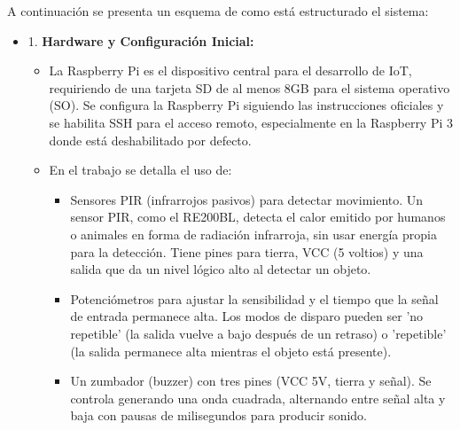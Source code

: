 \documentclass{report}
\begin{document}
A continuación se presenta un esquema de como está estructurado el sistema:
\begin{itemize}
\item 1. \textbf{Hardware y Configuración Inicial:}
\begin{itemize}
    \item La Raspberry Pi es el dispositivo central para el desarrollo de IoT, requiriendo de una tarjeta SD de al menos 8GB para 
    el sistema operativo (SO). Se configura la Raspberry Pi siguiendo las instrucciones oficiales y se habilita SSH para el 
    acceso remoto, especialmente en la Raspberry Pi 3 donde está deshabilitado por defecto.
    \item En el trabajo se detalla el uso de:
    \begin{itemize}
        \item Sensores PIR (infrarrojos pasivos) para detectar movimiento. Un sensor PIR, como el RE200BL, 
        detecta el calor emitido por humanos o animales en forma de radiación infrarroja, sin usar energía propia para la detección. 
        Tiene pines para tierra, VCC (5 voltios) y una salida que da un nivel lógico alto al detectar un objeto.
        \item Potenciómetros para ajustar la sensibilidad y el tiempo que la señal de entrada permanece alta. 
        Los modos de disparo pueden ser 'no repetible' (la salida vuelve a bajo después de un retraso) o 'repetible' (la salida 
        permanece alta mientras el objeto está presente).
        \item Un zumbador (buzzer) con tres pines (VCC 5V, tierra y señal). Se controla generando 
        una onda cuadrada, alternando entre señal alta y baja con pausas de milisegundos para producir sonido.
    \end{itemize}
\end{itemize}


\end{itemize}
\end{document}
